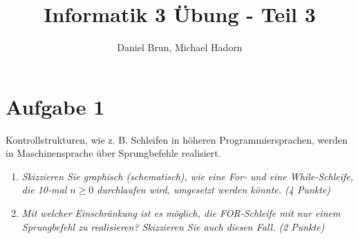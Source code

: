 \documentclass[10pt]{article}
\title{Informatik 3 Übung - Teil 3\vspace{-2ex}}
\author{Daniel Brun, Michael Hadorn\vspace{-2ex}}
\begin{document}
\maketitle

\section*{Aufgabe 1}
Kontrollstrukturen, wie z. B. Schleifen in höheren Programmiersprachen, werden in Maschinensprache über Sprungbefehle realisiert.
\begin{enumerate}[label=\alph*)]
	\item
		\textit{Skizzieren Sie graphisch (schematisch), wie eine For- und eine While-Schleife, die 10-mal \(n \ge 0\) durchlaufen wird, umgesetzt werden könnte. (4 Punkte)}
		
	
	
	
	\item
		\textit{Mit welcher Einschränkung ist es möglich, die FOR-Schleife mit nur einem Sprungbefehl zu realisieren? Skizzieren Sie auch diesen Fall. (2 Punkte)}
		
		
\end{enumerate}


\end{document}
